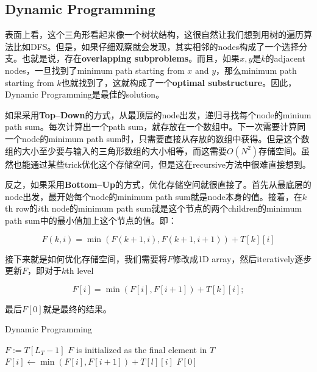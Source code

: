 \subsection{Dynamic Programming}
\begin{CJK*}{UTF8}{gbsn}
表面上看，这个三角形看起来像一个树状结构，这很自然让我们想到用树的遍历算法比如DFS。但是，如果仔细观察就会发现，其实相邻的nodes构成了一个选择分支。也就是说，存在\textbf{overlapping subproblems}。而且，如果$x, y$是$k$的adjacent nodes，一旦找到了minimum path starting from $x$ and $y$，那么minimum path starting from $k$也就找到了，这就构成了一个\textbf{optimal substructure}。因此，Dynamic Programming是最佳的solution。
\end{CJK*}
\par
\begin{CJK*}{UTF8}{gbsn}
如果采用\textbf{Top--Down}的方式，从最顶层的node出发，递归寻找每个node的minium path sum。每次计算出一个path sum，就存放在一个数组中。下一次需要计算同一个node的minimum path sum时，只需要直接从存放的数组中获得。但是这个数组的大小至少要与输入的三角形数组的大小相等，而这需要$O(N^2)$存储空间。虽然也能通过某些trick优化这个存储空间，但是这在recursive方法中很难直接想到。
\end{CJK*}
\par
\begin{CJK*}{UTF8}{gbsn}
反之，如果采用\textbf{Bottom--Up}的方式，优化存储空间就很直接了。首先从最底层的node出发，最开始每个node的minimum path sum就是node本身的值。接着，在$k$th row的$i$th node的minimum path sum就是这个节点的两个children的minimum path sum中的最小值加上这个节点的值。即：
\end{CJK*}
\[
F(k,i)=\min(F(k+1, i), F(k+1, i+1)) + T[k][i]
\]
\begin{CJK*}{UTF8}{gbsn}
接下来就是如何优化存储空间，我们需要将$F$修改成1D array，然后iteratively逐步更新$F$，即对于$k$th level
\end{CJK*}
\[
F[i] = \min(F[i], F[i+1]) + T[k][i];
\]
\begin{CJK*}{UTF8}{gbsn}
最后$F[0]$就是最终的结果。
\end{CJK*}
\setcounter{algorithm}{0}
\begin{algorithm}[H]
\caption{Dynamic Programming}
\begin{algorithmic}[1]
\State $F:=T[L_T-1]$ \Comment $F$ is initialized as the final element in $T$
\State $F[i]\gets \min(F[i], F[i+1]) + T[l][i]$
\EndFor
\EndFor
\State \Return $F[0]$
\EndProcedure
\end{algorithmic}
\end{algorithm}